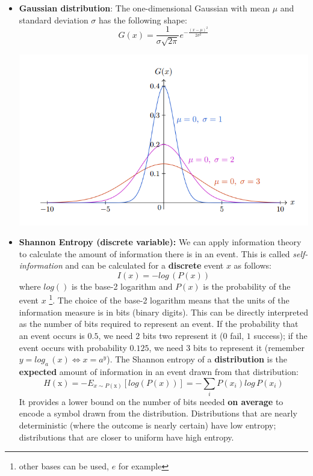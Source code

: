 \begin{itemize}
    \item \textbf{Gaussian distribution}: The one-dimensional Gaussian with mean $\mu$ and standard deviation $\sigma$ has the following shape:
    \[G(x) = \frac{1}{\sigma \sqrt{2\pi}}e^{-\frac{(x-\mu)^{2}}{2\sigma^{2}}}\]
    \begin{center}
        \includegraphics[]{images/Gaussian.png}
    \end{center}

    \item \textbf{Shannon Entropy (discrete variable):} 
    We can apply information theory to calculate the amount of information there is in an event. This is called \textit{self-information} and can be calculated for a \textbf{discrete} event $x$ as follows:
    \[I(x) = -log\,(P(x))\]
    where $log()$ is the base-2 logarithm and $P(x)$ is the probability of the event $x$ \footnote{other bases can be used, $e$ for example}.
    \newline\newline
    The choice of the base-2 logarithm means that the units of the information measure is in bits (binary digits). This can be directly interpreted as the number of bits required to represent an event. If the probability that an event occurs is $0.5$, we need 2 bits two represent it ($0$ fail, $1$ success); if the event occurs with probability $0.125$, we need $3$ bits to represent it (remember $y = log_a\,(x) \iff x = a^y$).
    \newline\newline
    The Shannon entropy of a \textbf{distribution} is the \textbf{expected} amount of information in an event drawn from that distribution:
    \[H(\text{x}) = - E_{x \sim P(\text{x})}[log(P(x))] = -\sum_i P(x_i) log\,P(x_i)\]
    It provides a lower bound on the number of bits needed \textbf{on average} to encode a symbol drawn from the distribution.\newline\newline
    Distributions that are nearly deterministic (where the outcome is nearly certain) have low entropy; distributions that are closer to uniform have high entropy.
    


\end{itemize}
